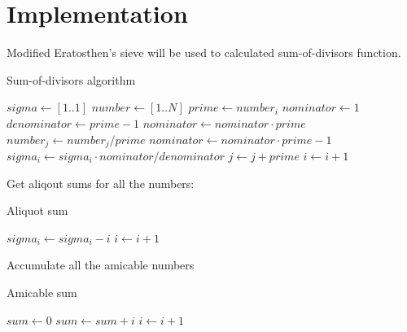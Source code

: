 \documentclass{article}
\begin{document}
\section{Implementation}
Modified Eratosthen's sieve will be used to calculated sum-of-divisors function.
\begin{algorithm}
    \caption{Sum-of-divisors algorithm}\label{alg:sigma_1}
    \begin{algorithmic}[1]
        \State $sigma \gets [1 .. 1]$ 
        \State $number \gets [1 .. N]$
             
                \State $prime \gets number_i$
                 
                    \State $nominator \gets 1$
                    \State $denominator \gets prime - 1$
                     
                        \State $nominator \gets nominator \cdot prime$
                        \State $number_j \gets number_j / prime$
                    \EndWhile
                    \State $nominator \gets nominator \cdot prime - 1$
                    \State $sigma_i \gets sigma_i \cdot nominator / denominator$
                \State $j \gets j + prime$
                \EndFor
            \EndIf
            \State $i \gets i + 1$
        \EndFor
    \end{algorithmic}
\end{algorithm}

Get aliqout sums for all the numbers:
\begin{algorithm}
    \caption{Aliquot sum} \label{alg:aliqout}
    \begin{algorithmic}[1]
            \State $sigma_i \gets sigma_i - i$
            \State $i \gets i + 1$
        \EndFor
    \end{algorithmic}
\end{algorithm}

Accumulate all the amicable numbers
\begin{algorithm}
    \caption{Amicable sum} \label{alg:amicable}
    \begin{algorithmic}[1]
        \State $sum \gets 0$
            \State $sum \gets sum + i$
            \EndIf
            \State $i \gets i + 1$
        \EndFor
    \end{algorithmic}
\end{algorithm}
\end{document}
